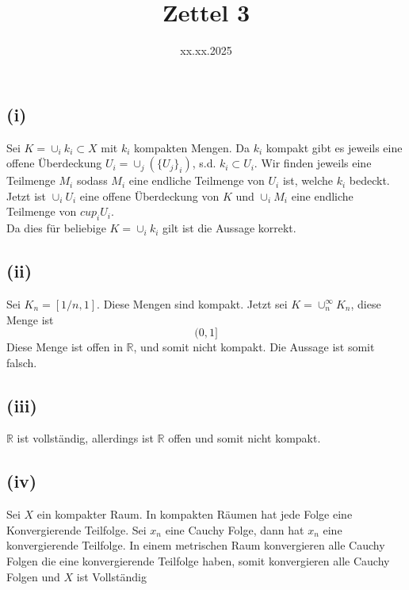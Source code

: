 \documentclass[]{scrartcl}
\title{Zettel 3}
\author{}
\date{xx.xx.2025}
\begin{document}
\maketitle
\newpage
\tableofcontents
\newpage

\section{}

\section{}

\section{}
\subsection{(i)}

Sei $K = \cup_i k_i \subset X$ mit $k_i$ kompakten Mengen. Da $k_i$ kompakt gibt es 
jeweils eine offene Überdeckung $U_i = \cup_j\left(\{U_j\}_i\right)$, s.d. $k_i\subset U_i$.
Wir finden jeweils eine Teilmenge $M_i$ sodass $M_i$ eine endliche Teilmenge von $U_i$
ist, welche $k_i$ bedeckt.\\
Jetzt ist $\cup_i U_i$ eine offene Überdeckung von $K$ und $\cup_i M_i$ eine endliche Teilmenge von $cup_i U_i$.\\
Da dies für beliebige $K=\cup_i k_i$ gilt ist die Aussage korrekt.

\subsection{(ii)}
Sei $K_n = [1/n, 1]$. Diese Mengen sind kompakt. Jetzt sei $K = \cup_n^\infty K_n$, diese Menge ist
$$
(0, 1]
$$
Diese Menge ist offen in $\mathbb R$, und somit nicht kompakt. Die Aussage ist somit falsch.

\subsection{(iii)}
$\mathbb R$ ist vollständig, allerdings ist $\mathbb R$ offen und somit nicht kompakt.

\subsection{(iv)}
Sei $X$ ein kompakter Raum. In kompakten Räumen hat jede Folge eine Konvergierende Teilfolge. 
Sei $x_n$ eine Cauchy Folge, dann hat $x_n$ eine konvergierende Teilfolge. 
In einem metrischen Raum konvergieren alle Cauchy Folgen die eine konvergierende Teilfolge haben, 
somit konvergieren alle Cauchy Folgen und $X$ ist Vollständig
\end{document}
